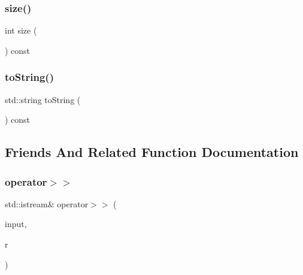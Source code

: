 \subsubsection{\texorpdfstring{size()}{size()}}
{\footnotesize\ttfamily int size (\begin{DoxyParamCaption}{ }\end{DoxyParamCaption}) const}

\mbox{\label{classIntRange_a1fe5121d6528fdea3f243321b3fa3a49}} 
\subsubsection{\texorpdfstring{to\+String()}{toString()}}
{\footnotesize\ttfamily std\+::string to\+String (\begin{DoxyParamCaption}{ }\end{DoxyParamCaption}) const}



\subsection{Friends And Related Function Documentation}
\mbox{\label{classIntRange_a4b452901f18832cc506afd0f320e5934}} 
\subsubsection{\texorpdfstring{operator$>$$>$}{operator>>}}
{\footnotesize\ttfamily std\+::istream\& operator$>$$>$ (\begin{DoxyParamCaption}\item[{std\+::istream \&}]{input,  }\item[{\mbox{\hyperlink{classIntRange}{Int\+Range}} \&}]{r }\end{DoxyParamCaption})\hspace{0.3cm}{\ttfamily [friend]}}

